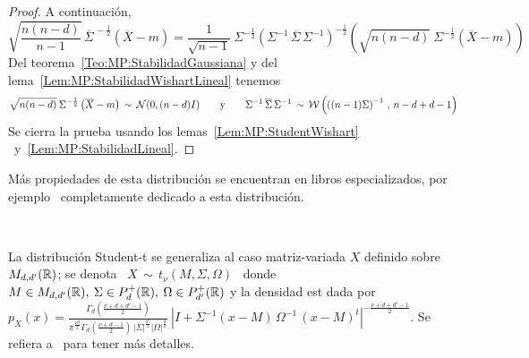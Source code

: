 \begin{proof}
  A continuaci\'on,
  \[
  \sqrt{\frac{n   (n-d)}{n-1}}   \,   \overline{\Sigma}^{\,   -\frac12}   \left(
    \overline{X}-m \right)  = \frac{1}{\sqrt{n-1}} \:  \Sigma^{- \frac12} \left(
    \Sigma^{-1}  \, \overline{\Sigma}  \, \Sigma^{-1}  \right)^{-\frac12} \left(
    \sqrt{n (n-d)} \: \Sigma^{-\frac12} \left( \overline{X}-m \right) \right)
  \]
  Del           teorema~\ref{Teo:MP:StabilidadGaussiana}          y          del
  lema~\ref{Lem:MP:StabilidadWishartLineal} tenemos
  \[
  \sqrt{n (n-d)}  \: \Sigma^{-\frac12} \left( \overline{X}-m \right)  \, \sim \,
  \mathcal{N}(0 ,  (n-d) I)  \qquad \mbox{y} \qquad  \Sigma^{-1} \,  \overline{\Sigma} \,
  \Sigma^{-1}  \, \sim  \, \mathcal{W}\left(  \left( (n-1)  \Sigma \right)^{-1}  \,  , \,
    n-d+d-1 \right)
  \]
  Se   cierra   la  prueba   usando   los  lemas~\ref{Lem:MP:StudentWishart}   \
  y~\ref{Lem:MP:StabilidadLineal}.
\end{proof}



M\'as propiedades de esta distribuci\'on se encuentran en libros especializados,
por ejemplo~\cite{KotNad04} completamente dedicado a esta distribuci\'on.

\

La distribuci\'on  Student-t se generaliza  al caso matriz-variada  $X$ definido
sobre $M_{d,d'}(\mathbb{R})$;  se denota  \ $X \,  \sim \,  t_\nu(M,\Sigma,\Omega)$ \
donde  \ $M  \in  M_{d,d'}(\mathbb{R}), \:  \Sigma  \in P_d^+(\mathbb{R}),  \: \Omega  \in
P_{d'}^+(\mathbb{R})$   y  la  densidad   est  dada   por  $\displaystyle   p_X(x)  =
\frac{\Gamma_d\left(      \frac{\nu+d+d'-1}{2}\right)}{\pi^{\frac{\nu     d}{2}}
  \Gamma_d\left(       \frac{\nu+d-1}{2}\right)      \,       \left|      \Sigma
  \right|^{\frac{d'}{2}}  \left|  \Omega \right|^{\frac{d}{2}}}  \:  \left| I  +
  \Sigma^{-1}     (x-M)     \,     \Omega^{-1}     \,     (x-M)^t     \right|^{-
  \frac{\nu+d+d'-1}{2}}$. Se refiera  a~\cite[Cap.~4]{GupNag99} para tener m\'as
detalles.
